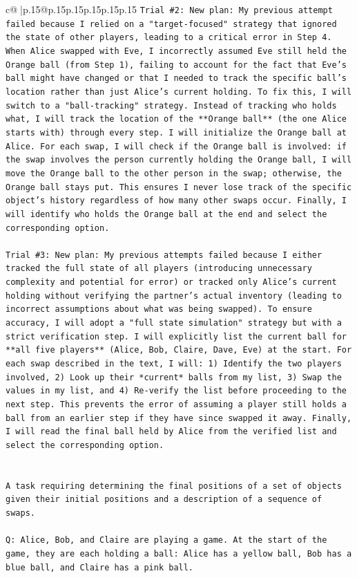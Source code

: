 \documentclass{article}
\begin{document}
{\begin{supertabular}{c@{$\;$}|p{.15\linewidth}@{}p{.15\linewidth}p{.15\linewidth}p{.15\linewidth}p{.15\linewidth}p{.15\linewidth}}
{{{\texttt{Trial \#2: New plan: My previous attempt failed because I relied on a "target{-}focused" strategy that ignored the state of other players, leading to a critical error in Step 4. When Alice swapped with Eve, I incorrectly assumed Eve still held the Orange ball (from Step 1), failing to account for the fact that Eve's ball might have changed or that I needed to track the specific ball's location rather than just Alice's current holding. To fix this, I will switch to a "ball{-}tracking" strategy. Instead of tracking who holds what, I will track the location of the **Orange ball** (the one Alice starts with) through every step. I will initialize the Orange ball at Alice. For each swap, I will check if the Orange ball is involved: if the swap involves the person currently holding the Orange ball, I will move the Orange ball to the other person in the swap; otherwise, the Orange ball stays put. This ensures I never lose track of the specific object's history regardless of how many other swaps occur. Finally, I will identify who holds the Orange ball at the end and select the corresponding option.} \\
\\ 
\texttt{Trial \#3: New plan: My previous attempts failed because I either tracked the full state of all players (introducing unnecessary complexity and potential for error) or tracked only Alice's current holding without verifying the partner's actual inventory (leading to incorrect assumptions about what was being swapped). To ensure accuracy, I will adopt a "full state simulation" strategy but with a strict verification step. I will explicitly list the current ball for **all five players** (Alice, Bob, Claire, Dave, Eve) at the start. For each swap described in the text, I will: 1) Identify the two players involved, 2) Look up their *current* balls from my list, 3) Swap the values in my list, and 4) Re{-}verify the list before proceeding to the next step. This prevents the error of assuming a player still holds a ball from an earlier step if they have since swapped it away. Finally, I will read the final ball held by Alice from the verified list and select the corresponding option.} \\
\\ 
\\ 
\texttt{A task requiring determining the final positions of a set of objects given their initial positions and a description of a sequence of swaps.} \\
\\ 
\texttt{Q: Alice, Bob, and Claire are playing a game. At the start of the game, they are each holding a ball: Alice has a yellow ball, Bob has a blue ball, and Claire has a pink ball.} \\
}}}
\end{supertabular}}
\end{document}
